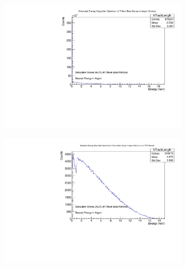 \begin{figure}[htbp]
	\centering
	\begin{subfigure}[b]{0.45\textwidth}
		\includegraphics[width=\textwidth]{figures/0Edep.pdf}
		\caption{}
		\label{fig:0Edep}
	\end{subfigure}
	\hfill
	\begin{subfigure}[b]{0.45\textwidth}
		\includegraphics[width=\textwidth]{figures/01Edep.pdf}
		\caption{}
		\label{fig:01Edep}
	\end{subfigure}


\end{figure}
